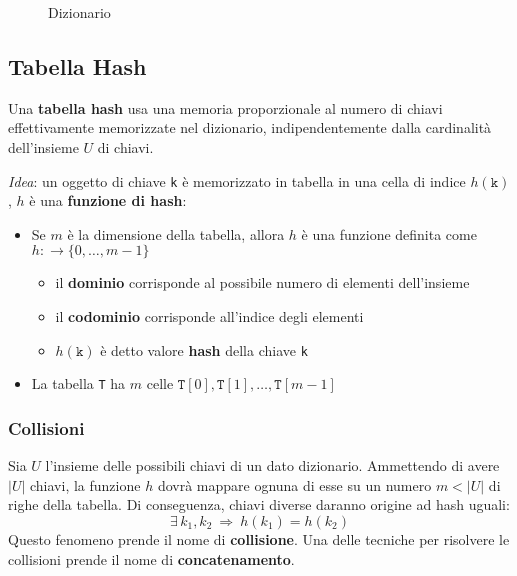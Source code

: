 \documentclass[italian, 10pt]{article}
\begin{document}
\begin{figure}[htbp]
  \bigskip
  \centering
  \caption{Dizionario}
  \label{fig:dizionario}
  \bigskip
\end{figure}

\subsection{Tabella Hash}

Una \textbf{tabella hash} usa una memoria proporzionale al numero di chiavi effettivamente memorizzate nel dizionario, indipendentemente dalla cardinalità dell'insieme \(U\) di chiavi.

\textit{Idea}: un oggetto di chiave \texttt{k} è memorizzato in tabella in una cella di indice \(h(\texttt{k})\), \(h\) è una \textbf{funzione di hash}:

\begin{itemize}
  \item Se \(m\) è la dimensione della tabella, allora \(h\) è una funzione definita come \(h: \rightarrow \{0, \ldots, m-1\}\)
        \begin{itemize}
          \item il \textbf{dominio} corrisponde al possibile numero di elementi dell'insieme
          \item il \textbf{codominio} corrisponde all'indice degli elementi
          \item \(h(\texttt{k})\) è detto valore \textbf{hash} della chiave \texttt{k}
        \end{itemize}
  \item La tabella \texttt{T} ha \(m\) celle \(\texttt{T}[0], \texttt{T}[1], \ldots, \texttt{T}[m-1]\)
\end{itemize}

\subsubsection{Collisioni}

Sia \(U\) l'insieme delle possibili chiavi di un dato dizionario.
Ammettendo di avere \(\left|U\right|\) chiavi, la funzione \(h\) dovrà mappare ognuna di esse su un numero \(m < |U|\) di righe della tabella.
Di conseguenza, chiavi diverse daranno origine ad hash uguali:
\[\exists \, k_1, k_2 \ \Rightarrow \ h(k_1) = h(k_2) \]
Questo fenomeno prende il nome di \textbf{collisione}.
Una delle tecniche per risolvere le collisioni prende il nome di \textbf{concatenamento}.
\end{document}
